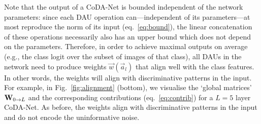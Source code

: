 Note that the output of a CoDA-Net is bounded independent of the network parameters: since each DAU operation can---independent of its parameters---at most reproduce the norm of its input (eq.~\eqref{eq:bound}), the linear concatenation of these operations necessarily also has an upper bound which does not depend on the parameters.
Therefore, in order to achieve maximal outputs on average (e.g., the class logit over the subset of images of that class), all DAUs in the network need to produce weights $\vec w (\vec a_l)$ that align well with the class features. In other words, the weights will align with discriminative patterns in the input.
For example, in Fig.~\ref{fig:alignment} (bottom), we visualise the `global matrices' $\mat W_{0\rightarrow L}$ and the corresponding contributions (eq.~\eqref{eq:contrib}) for a $L=5$ layer CoDA-Net. As before, the weights align with discriminative patterns in the input and do not encode the uninformative noise.
%
%
%
%

